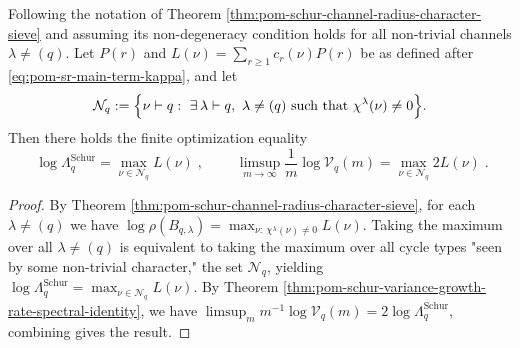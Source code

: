 \begin{corollary}\label{cor:pom-schur-variance-exponent-partition-optimization}
Following the notation of Theorem \ref{thm:pom-schur-channel-radius-character-sieve} and assuming its non-degeneracy condition holds for all non-trivial channels \(\lambda\neq(q)\).
Let \(P(r)\) and \(L(\nu)=\sum_{r\ge1}c_r(\nu)P(r)\) be as defined after \eqref{eq:pom-sr-main-term-kappa},
and let
\[
\mathcal N_q:=\Bigl\{\nu\vdash q:\ \exists\,\lambda\vdash q,\ \lambda\neq(q)\ \text{such that}\ \chi^\lambda(\nu)\neq0\Bigr\}.
\]
Then there holds the finite optimization equality
\[
\boxed{\;
\log\Lambda_q^{\mathrm{Schur}}=\max_{\nu\in\mathcal N_q}L(\nu)\;},
\qquad
\boxed{\;
\limsup_{m\to\infty}\frac{1}{m}\log\mathcal V_q(m)=\max_{\nu\in\mathcal N_q}2L(\nu)\; } .
\]
\end{corollary}
\begin{proof}
By Theorem \ref{thm:pom-schur-channel-radius-character-sieve},
for each \(\lambda\neq(q)\) we have
\(
\log\rho(B_{q,\lambda})=\max_{\nu:\ \chi^\lambda(\nu)\neq0}L(\nu)
\).
Taking the maximum over all \(\lambda\neq(q)\) is equivalent to taking the maximum over all cycle types "seen by some non-trivial character," the set \(\mathcal N_q\), yielding
\(
\log\Lambda_q^{\mathrm{Schur}}=\max_{\nu\in\mathcal N_q}L(\nu)
\).
By Theorem \ref{thm:pom-schur-variance-growth-rate-spectral-identity}, we have
\(
\limsup_m m^{-1}\log\mathcal V_q(m)=2\log\Lambda_q^{\mathrm{Schur}}
\),
combining gives the result.
\end{proof}

